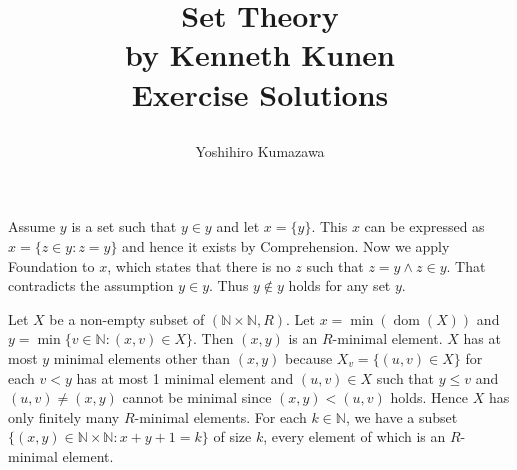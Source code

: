 \documentclass[12pt]{article}
\title{
  \vspace{-2cm}
  Set Theory \\
  \large by Kenneth Kunen \\
  Exercise Solutions
  \author{Yoshihiro Kumazawa}
}
\newcommand{\dom}{\mathop{\mathrm{dom}}}
\theoremstyle{definition}
\newenvironment{customthm}[1]
  {\renewcommand\theinnercustomthm{#1}\innercustomthm}
  {\endinnercustomthm}
\begin{document}
\maketitle

\begin{customthm}{I.4.18}
  Assume $y$ is a set such that $y\in y$ and let $x=\{y\}$. This $x$ can be expressed as $x=\{z\in y:z=y\}$ and hence it exists by Comprehension. Now we apply Foundation to $x$, which states that there is no $z$ such that $z=y\wedge z\in y$. That contradicts the assumption $y\in y$. Thus $y\not\in y$ holds for any set $y$.
\end{customthm}

\begin{customthm}{I.6.23}
  Let $X$ be a non-empty subset of $(\mathbb{N}\times\mathbb{N},R)$. Let $x=\min(\dom(X))$ and $y=\min\{v\in\mathbb{N}:(x,v)\in X\}$. Then $(x,y)$ is an $R$-minimal element. $X$ has at most $y$ minimal elements other than $(x,y)$ because $X_v=\{(u,v)\in X\}$ for each $v<y$ has at most 1 minimal element and $(u,v)\in X$ such that $y\leq v$ and $(u,v)\neq(x,y)$ cannot be minimal since $(x,y)<(u,v)$ holds. Hence $X$ has only finitely many $R$-minimal elements. For each $k\in\mathbb{N}$, we have a subset $\{(x,y)\in\mathbb{N}\times\mathbb{N}:x+y+1=k\}$ of size $k$, every element of which is an $R$-minimal element.
\end{customthm}
\end{document}
